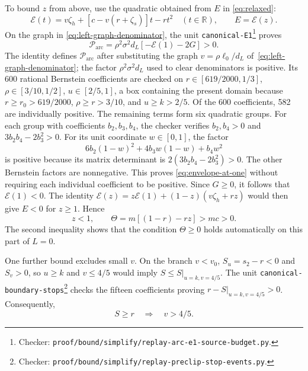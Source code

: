 \documentclass[11pt]{article}
\theoremstyle{remark}
\theoremstyle{plain}
\begin{document}
To bound $z$ from above, use the quadratic obtained from $E$ in
\eqref{eq:relaxed}:
\begin{equation}
 \mathcal E(t)=v\zeta_h+[c-v(r+\zeta_s)]t-rt^2\quad(t\in\mathbb R),
 \qquad E=\mathcal E(z).
 \label{eq:envelope-quadratic}
\end{equation}
On the graph in \eqref{eq:left-graph-denominator}, the unit
\nolinkurl{canonical-E1}\footnote{Checker:
\nolinkurl{proof/bound/simplify/replay-arc-e1-source-budget.py}.\label{fn:checker-canonical-E1}} proves
\begin{equation}
 \mathcal P_{\mathrm{arc}}
 =\rho^2\sigma^2d_L[-\mathcal E(1)-2G]>0.
 \label{eq:envelope-at-one}
\end{equation}
The identity defines $\mathcal P_{\mathrm{arc}}$ after substituting
the graph $v=\rho\ell_0/d_L$ of~\eqref{eq:left-graph-denominator};
the factor $\rho^2\sigma^2d_L$ used to clear denominators is positive.
Its 600 rational Bernstein coefficients are checked on
$r\in[619/2000,1/3]$, $\rho\in[3/10,1/2]$, $u\in[2/5,1]$,
a box containing the present domain because $r\ge r_0>619/2000$,
$\rho\ge r>3/10$, and $u\ge k>2/5$.
Of the 600 coefficients, 582 are individually positive. The
remaining terms form six quadratic groups. For each group with
coefficients $b_2,b_3,b_4$, the checker verifies $b_2,b_4>0$ and
$3b_2b_4-2b_3^2>0$. For its unit coordinate $w\in[0,1]$, the factor
\[
 6b_2(1-w)^2+4b_3w(1-w)+b_4w^2
\]
is positive because its matrix determinant is
$2(3b_2b_4-2b_3^2)>0$. The other Bernstein factors are nonnegative.
This proves \eqref{eq:envelope-at-one} without requiring each
individual coefficient to be positive.
Since $G\ge0$, it follows that $\mathcal E(1)<0$.
The identity
$\mathcal E(z)=z\mathcal E(1)+(1-z)(v\zeta_h+rz)$
would then give $E<0$ for $z\ge1$. Hence
\begin{equation}
 z<1,\qquad \Theta=m[(1-r)-rz]>mc>0.
 \label{eq:left-upper-weight}
\end{equation}
The second inequality shows that the condition
$\Theta\ge0$ holds automatically on this part of $L=0$.

One further bound excludes small $v$. On the branch $v<v_0$,
$S_u=s_2-r<0$ and $S_v>0$, so $u\ge k$ and $v\le4/5$ would imply
$S\le\left.S\right|_{u=k,v=4/5}$. The unit \nolinkurl{canonical-boundary-stops}\footnote{Checker:
\nolinkurl{proof/bound/simplify/replay-preclip-stop-events.py}.\label{fn:checker-canonical-boundary-stops}} checks the fifteen
coefficients proving $r-\left.S\right|_{u=k,v=4/5}>0$. Consequently,
\begin{equation}
 S\ge r\quad\Longrightarrow\quad v>4/5.
 \label{eq:left-v-lower}
\end{equation}
\end{document}
